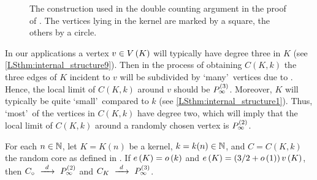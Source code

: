 \begin{figure}[t]
	\caption{The construction used in the double counting argument in the proof of . The vertices lying in the kernel are marked by a square, the others by a circle.}
	\label{LSfig:double_counting}
\end{figure}
In our applications a vertex $v\in V\left(K\right)$ will typically have degree three in $K$ (see \ref{LSthm:internal_structure9}). Then in the process of obtaining $C(K,k)$ the three edges of $K$ incident to $v$ will be subdivided by \lq many\rq\ vertices due to . Hence, the local limit of $C(K,k)$ around $v$ should be $P_{\infty}^{\left(3\right)}$. Moreover, $K$ will typically be quite \lq small\rq\ compared to $k$ (see \ref{LSthm:internal_structure1}). Thus, \lq most\rq\ of the vertices in $C(K,k)$ have degree two, which will imply that the local limit of $C(K,k)$ around a randomly chosen vertex is $P_{\infty}^{\left(2\right)}$.
\begin{lem}\label{LSlem:random_core_local}
	For each $n\in\mathbb{N}$, let $K=K(n)$ be a kernel, $k=k(n)\in\mathbb{N}$, and $C=C(K,k)$ the random core as defined in . If $e\left({K}\right)=o\left(k\right)$ and $e\left({K}\right)=\left(3/2+o\left(1\right)\right)v\left({K}\right)$, then $C_\circ~\xrightarrow{~d~}~P_{\infty}^{\left(2\right)}$ and $C_K~\xrightarrow{~d~}~P_{\infty}^{\left(3\right)}$.
\end{lem}
